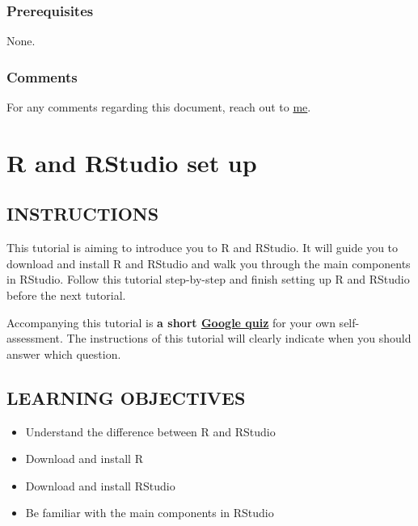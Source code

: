 \documentclass[
]{book}
\begin{document}
\hypertarget{prerequisites}{%
\subsection*{Prerequisites}\label{prerequisites}}

None.

\hypertarget{comments}{%
\subsection*{Comments}\label{comments}}

For any comments regarding this document, reach out to \href{http://ehsank.com/}{me}.

\hypertarget{r-and-rstudio-set-up}{%
\chapter{R and RStudio set up}\label{r-and-rstudio-set-up}}

\hypertarget{instructions}{%
\section{INSTRUCTIONS}\label{instructions}}

This tutorial is aiming to introduce you to R and RStudio. It will guide you to download and install R and RStudio and walk you through the main components in RStudio. Follow this tutorial step-by-step and finish setting up R and RStudio before the next tutorial.

Accompanying this tutorial is \textbf{a short \href{https://forms.gle/Xf1AfoGaxhwrWRQ38}{Google quiz}} for your own self-assessment. The instructions of this tutorial will clearly indicate when you should answer which question.

\hypertarget{learning-objectives}{%
\section{LEARNING OBJECTIVES}\label{learning-objectives}}

\begin{itemize}
\item
  Understand the difference between R and RStudio
\item
  Download and install R
\item
  Download and install RStudio
\item
  Be familiar with the main components in RStudio
\end{itemize}
\end{document}
